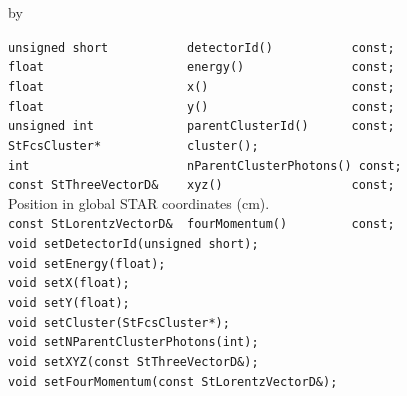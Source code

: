 \documentclass[twoside]{article}
\newcommand{\entrylabel}[1]{\mbox{\textbf{{#1}}}\hfil}%
\newenvironment{entry}
{\begin{list}{}%
    {\renewcommand{\makelabel}{\entrylabel}%
     \setlength{\labelwidth}{90pt}%
     \setlength{\leftmargin}{\labelwidth}
     \advance\leftmargin by \labelsep%
      }%
    }%
  {\end{list}}
\newcommand{\Entrylabel}[1]%
{\raisebox{0pt}[1ex][0pt]{\makebox[\labelwidth][l]%
    {\parbox[t]{\labelwidth}{\hspace{0pt}\textbf{{#1}}}}}}
\newenvironment{Entry}%
{\renewcommand{\entrylabel}{\Entrylabel}\begin{entry}}%
  {\end{entry}}
\begin{document}
\begin{Entry}
\item[Public Member\\ Functions]
    \verb+unsigned short           detectorId()           const;+\\
    \verb+float                    energy()               const;+\\
    \verb+float                    x()                    const;+\\
    \verb+float                    y()                    const;+\\
    \verb+unsigned int             parentClusterId()      const;+\\
    \verb+StFcsCluster*            cluster();+\\
    \verb+int                      nParentClusterPhotons() const;+\\
    \verb+const StThreeVectorD&    xyz()                  const;+\\
        Position in global STAR coordinates (cm).\\
    \verb+const StLorentzVectorD&  fourMomentum()         const;+\\
    \verb+void setDetectorId(unsigned short);+\\
    \verb+void setEnergy(float);+\\
    \verb+void setX(float);+\\
    \verb+void setY(float);+\\
    \verb+void setCluster(StFcsCluster*);+\\
    \verb+void setNParentClusterPhotons(int);+\\
    \verb+void setXYZ(const StThreeVectorD&);+\\
    \verb+void setFourMomentum(const StLorentzVectorD&);+\\
\end{Entry}
\clearpage

\end{document}
